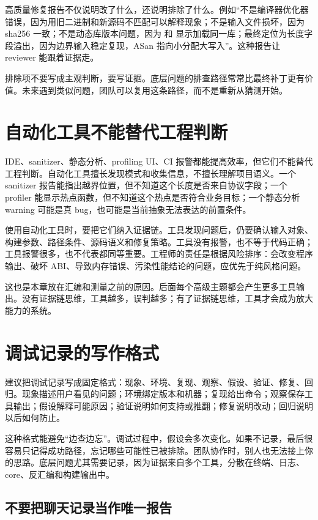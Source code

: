 高质量修复报告不仅说明改了什么，还说明排除了什么。例如“不是编译器优化器错误，因为用旧二进制和新源码不匹配可以解释现象；不是输入文件损坏，因为 sha256 一致；不是动态库版本问题，因为  和  显示加载同一库；最终定位为长度字段溢出，因为边界输入稳定复现，ASan 指向小分配大写入”。这种报告让 reviewer 能跟着证据走。

排除项不要写成主观判断，要写证据。底层问题的排查路径常常比最终补丁更有价值。未来遇到类似问题，团队可以复用这条路径，而不是重新从猜测开始。

\section{自动化工具不能替代工程判断}

IDE、sanitizer、静态分析、profiling UI、CI 报警都能提高效率，但它们不能替代工程判断。自动化工具擅长发现模式和收集信息，不擅长理解项目语义。一个 sanitizer 报告能指出越界位置，但不知道这个长度是否来自协议字段；一个 profiler 能显示热点函数，但不知道这个热点是否符合业务目标；一个静态分析 warning 可能是真 bug，也可能是当前抽象无法表达的前置条件。

使用自动化工具时，要把它们纳入证据链。工具发现问题后，仍要确认输入对象、构建参数、路径条件、源码语义和修复策略。工具没有报警，也不等于代码正确；工具报警很多，也不代表都同等重要。工程师的责任是根据风险排序：会改变程序输出、破坏 ABI、导致内存错误、污染性能结论的问题，应优先于纯风格问题。

这也是本章放在汇编和测量之前的原因。后面每个高级主题都会产生更多工具输出。没有证据链思维，工具越多，误判越多；有了证据链思维，工具才会成为放大能力的系统。

\section{调试记录的写作格式}

建议把调试记录写成固定格式：现象、环境、复现、观察、假设、验证、修复、回归。现象描述用户看见的问题；环境绑定版本和机器；复现给出命令；观察保存工具输出；假设解释可能原因；验证说明如何支持或推翻；修复说明改动；回归说明以后如何防止。

这种格式能避免“边查边忘”。调试过程中，假设会多次变化。如果不记录，最后很容易只记得成功路径，忘记哪些可能性已被排除。团队协作时，别人也无法接上你的思路。底层问题尤其需要记录，因为证据来自多个工具，分散在终端、日志、core、反汇编和构建输出中。

\subsection{不要把聊天记录当作唯一报告}

